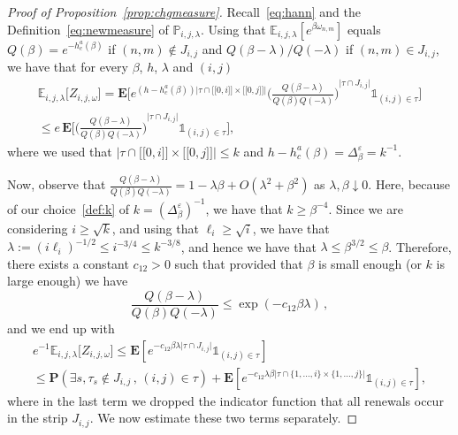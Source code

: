 \documentclass[10pt]{amsart}
\theoremstyle{definition}\newtheorem{defi}[theo]{Definition}\newtheorem{rema}[theo]{Remark}\newtheorem{exam}[theo]{Example}\newtheorem{exem}[theo]{Example}\newtheorem{nota}[theo]{Notation}
\newcommand{\llbracket}{\mathopen{[\![}}
\newcommand{\rrbracket}{\mathclose{]\!]}}
\newcommand{\gb}{\beta}
\newcommand{\gep}{\varepsilon}
\newcommand{\gD}{\Delta}
\newcommand{\go}{\omega}
\newcommand{\gl}{\lambda}
\newcommand{\unbf}%
{\mathds{1}}
\newcommand{\bP}{\ensuremath{\mathbf{P}}}
\newcommand{\bE}{\ensuremath{\mathbf{E}}}
\newcommand{\bbE}{\ensuremath{\mathbb{E}}}
\newcommand{\bbP}{\ensuremath{\mathbb{P}}}
\let\oldexists\exists
\renewcommand*{\exists}{\mathrel{\oldexists}}
\begin{document}
\begin{proof}[Proof of Proposition~\ref{prop:chgmeasure}]
Recall~\eqref{eq:hann} and the Definition~\eqref{eq:newmeasure} of $\bbP_{i,j,\gl}$. Using that $\bbE_{i,j,\gl}[e^{\gb \go_{n,m}}]$ equals $Q(\gb) =e^{- h_c^a(\gb)}$ if $(n,m) \notin J_{i,j}$ and $Q(\gb-\gl)/Q(-\gl)$ if $(n,m)\in J_{i,j}$, we have that for every $\beta$, $h$, $\lambda$ and $(i,j)$
\begin{multline}\label{eq:Q1}
\bbE_{i,j,\lambda} \big[Z_{i,j,\omega} \big] = \bE \bigg[e^{(h-h_c^a(\gb)) \vert \tau\cap \llbracket 0, i \rrbracket \times \llbracket 0, j \rrbracket \vert } { \Big(\frac{Q(\beta-\lambda)}{Q(\beta) Q(-\lambda)} \Big)}^{\vert \tau \cap J_{i,j} \vert} \unbf_{(i,j) \in \tau} \bigg] \\
\leq e\,\bE \bigg[{ \Big(\frac{Q(\beta-\lambda)}{Q(\beta) Q(-\lambda)} \Big)}^{ \vert \tau \cap J_{i,j} \vert } \unbf_{(i,j) \in \tau} \bigg],
\end{multline}
where we used that $\vert \tau\cap \llbracket 0, i \rrbracket \times \llbracket 0, j \rrbracket \vert \leq k$ and $h-h_c^a(\gb) = \gD_{\gb}^{\gep} = k^{-1}$.

Now, observe that $ \frac{Q(\beta-\lambda)}{Q(\beta) Q(-\lambda)} = 1 - \gl \gb +O(\gl^2 + \gb^2)$ as $\gl,\gb\downarrow 0$. Here, because of our choice~\eqref{def:k} of $k=(\gD_{\gb}^{\gep})^{-1}$, we have that $k\geq \gb^{-4}$. Since we are considering $i\geq \sqrt{k}$, and using that $\ell_i \geq \sqrt{i}$, we have that $\gl:= (i\ell_i)^{-1/2} \leq i^{-3/4} \leq k^{-3/8}$, and hence we have that $\gl \leq \gb^{3/2}\leq \gb$. Therefore, there exists a constant $c_{12}>0$ such that provided that $\gb$ is small enough (or $k$ is large enough) we have
\begin{equation}\label{eq:Q2}
\frac{Q(\beta-\lambda)}{Q(\beta) Q(-\lambda)} \le \exp(- c_{12} \beta \lambda)\,,
\end{equation}
and we end up with
\begin{multline}\label{eq:max1}
e^{-1}\bbE_{i,j,\lambda} \big[Z_{i,j,\omega} \big] \leq \bE \left[e^{ -c_{12} \gb \lambda \vert \tau \cap J_{i,j} \vert } \unbf_{(i,j) \in \tau} \right] \\
\leq \bP\left(\exists s, \tau_s \notin J_{i,j}\,,\,(i,j)\in\tau\right) + \bE\left[e^{- c_{12} \gl \gb \vert \tau \cap \lbrace 1,\dots,i \rbrace \times \lbrace 1,\dots,j \rbrace \vert } \unbf_{(i,j)\in\tau} \right],
\end{multline}
where in the last term we dropped the indicator function that all renewals occur in the strip $J_{i,j}$. We now estimate these two terms separately.


\end{proof}
\end{document}

